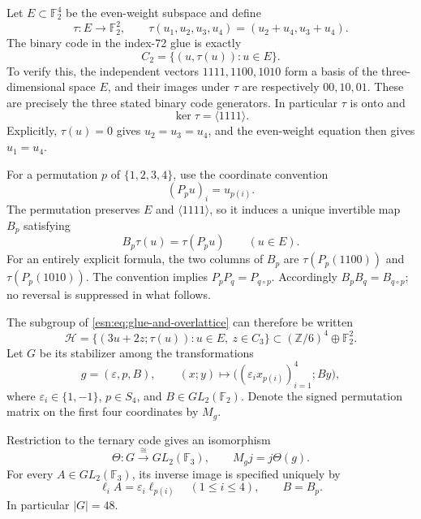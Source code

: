 Let \(E\subset\mathbb F_2^4\) be the even-weight subspace and define
\[
 \tau:E\longrightarrow\mathbb F_2^2,
 \qquad \tau(u_1,u_2,u_3,u_4)
       =(u_2+u_4,u_3+u_4).
\]
The binary code in the index-72 glue is exactly
\[
 C_2=\{(u,\tau(u)):u\in E\}.
\]
To verify this, the independent vectors
\(1111,1100,1010\) form a basis of the three-dimensional space \(E\),
and their images under \(\tau\) are respectively
\(00,10,01\).  These are precisely the three stated binary code generators.
In particular \(\tau\) is onto and
\[
 \ker\tau=\langle1111\rangle.
\]
Explicitly, \(\tau(u)=0\) gives \(u_2=u_3=u_4\), and the even-weight
equation then gives \(u_1=u_4\).

For a permutation \(p\) of \(\{1,2,3,4\}\), use the coordinate convention
\[
 (P_pu)_i=u_{p(i)}.
\]
The permutation preserves \(E\) and \(\langle1111\rangle\), so it induces
a unique invertible map \(B_p\) satisfying
\begin{equation}
 B_p\tau(u)=\tau(P_pu)\qquad(u\in E).
 \label{esn:eq:binary-permutation-map}
\end{equation}
For an entirely explicit formula, the two columns of \(B_p\) are
\(\tau(P_p(1100))\) and \(\tau(P_p(1010))\).
The convention implies \(P_pP_q=P_{q\circ p}\).  Accordingly
\(B_pB_q=B_{q\circ p}\); no reversal is suppressed in what follows.

The subgroup of \eqref{esn:eq:glue-and-overlattice} can therefore be written
\[
 \mathcal H=
 \{(3u+2z;\tau(u)):u\in E,\ z\in C_3\}
 \subset(\mathbb Z/6)^4\oplus\mathbb F_2^2.
\]
Let \(G\) be its stabilizer among the transformations
\[
 g=(\varepsilon,p,B),\qquad
 (x;y)\longmapsto
 \bigl((\varepsilon_i x_{p(i)})_{i=1}^4;By\bigr),
\]
where \(\varepsilon_i\in\{1,-1\}\), \(p\in S_4\), and
\(B\in GL_2(\mathbb F_2)\).  Denote the signed permutation matrix on the
first four coordinates by \(M_g\).

\begin{theorem}
\label{esn:thm:glue-gl2}
Restriction to the ternary code gives an isomorphism
\[
 \Theta:G\xrightarrow{\ \cong\ }GL_2(\mathbb F_3),
 \qquad M_gj=j\Theta(g).
\]
For every \(A\in GL_2(\mathbb F_3)\), its inverse image is specified
uniquely by
\begin{equation}
 \ell_iA=\varepsilon_i\ell_{p(i)}\quad(1\le i\le4),
 \qquad B=B_p.
 \label{esn:eq:inverse-gl2-glue-map}
\end{equation}
In particular \(|G|=48\).
\end{theorem}


